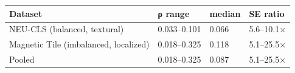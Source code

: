 \begin{tabular}{llll}
\toprule
Dataset & ρ range & median & SE ratio \\
\midrule
NEU-CLS (balanced, textural) & 0.033–0.101 & 0.066 & 5.6–10.1× \\
Magnetic Tile (imbalanced, localized) & 0.018–0.325 & 0.118 & 5.1–25.5× \\
Pooled & 0.018–0.325 & 0.087 & 5.1–25.5× \\
\bottomrule
\end{tabular}
